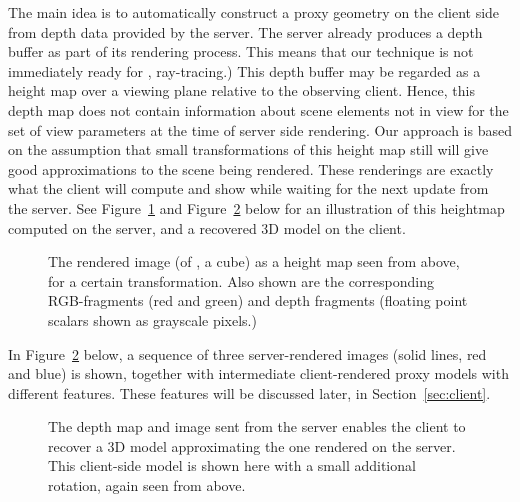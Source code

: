 The main idea is to automatically construct a proxy geometry on the client side
from depth data provided by the server. The server already produces a depth
buffer as part of its rendering process.  This means that our technique is not
immediately ready for \eg, ray-tracing.) This depth buffer may be regarded as a
height map over a viewing plane relative to the observing client. Hence, this
depth map does not contain information about scene elements not in view for the
set of view parameters at the time of server side rendering. Our approach is
based on the assumption that small transformations of this height map still will
give good approximations to the scene being rendered. These renderings are
exactly what the client will compute and show while waiting for the next update
from the server. See Figure~\ref{fig:2Dheightmap} and
Figure~\ref{fig:2DheightmapRotated} below for an illustration of this heightmap
computed on the server, and a recovered 3D model on the client.

\begin{figure}[htb]
  \centering
  
  \caption{\label{fig:2Dheightmap} The rendered image (of \eg, a cube) as a
           height map seen from above, for a certain transformation. Also shown
           are the corresponding RGB-fragments (red and green) and depth
           fragments (floating point scalars shown as grayscale pixels.)}
\end{figure}

In Figure~\ref{fig:2DheightmapRotated} below, a sequence of three server-rendered
images (solid lines, red and blue) is shown, together with intermediate
client-rendered proxy models with different features. These features will be
discussed later, in Section~\ref{sec:client}.

\begin{figure}[htb]
  \centering
  \caption{\label{fig:2DheightmapRotated}
           The depth map and image sent from the server enables the client to
           recover a 3D model approximating the one rendered on the server. This
           client-side model is shown here with a small additional rotation, again
           seen from above.}
\end{figure}

